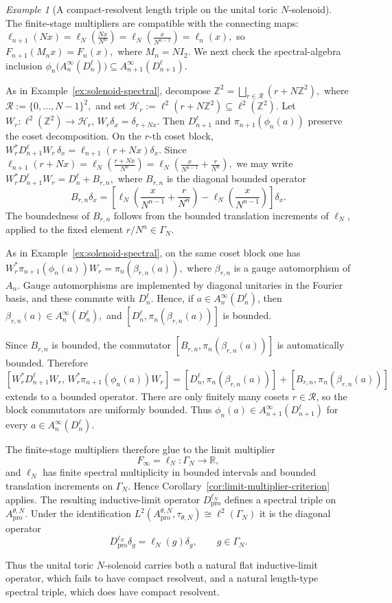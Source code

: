 \documentclass[11pt]{amsart}
\theoremstyle{definition}
\theoremstyle{remark}
\newtheorem{example}[theorem]{Example}
\newcommand{\Z}{\mathbb{Z}}
\newcommand{\R}{\mathbb{R}}
\newcommand{\ex}{\mathrm{pro}}
\begin{document}
\begin{example}[A compact-resolvent length triple on the unital toric \(N\)-solenoid]
The finite-stage multipliers are compatible with the connecting maps: $\ell_{n+1}(Nx)
=\ell_N\left(\frac{Nx}{N^n}\right)
=\ell_N\left(\frac{x}{N^{n-1}}\right)=\ell_n(x),$
so $F_{n+1}(M_nx)=F_n(x), $ where $M_n=NI_2.$ 
We next check the spectral-algebra inclusion $\phi_n\bigl(A_n^\infty(D_n^\ell)\bigr)
\subseteq A_{n+1}^\infty(D_{n+1}^\ell).$

As in Example~\ref{ex:solenoid-spectral}, decompose $\Z^2=\bigsqcup_{r\in\mathcal R}(r+N\Z^2),$ where
$\mathcal R:=\{0,\ldots,N-1\}^2,$ and set $\mathcal H_r:=\ell^2(r+N\Z^2)\subseteq \ell^2(\Z^2).$
Let $W_r\colon \ell^2(\Z^2)\to \mathcal H_r$, $W_r\delta_x=\delta_{r+Nx}.$
Then $D_{n+1}^\ell$ and \(\pi_{n+1}(\phi_n(a))\) preserve the coset decomposition. On the $r$-th coset block, $W_r^*D_{n+1}^\ell W_r\,\delta_x=\ell_{n+1}(r+Nx)\delta_x.$ Since $\ell_{n+1}(r+Nx)=\ell_N\left(\frac{r+Nx}{N^n}\right)
=\ell_N\left(\frac{x}{N^{n-1}}+\frac{r}{N^n}\right),$
we may write $W_r^*D_{n+1}^\ell W_r=D_n^\ell+B_{r,n},$
where \(B_{r,n}\) is the diagonal bounded operator
\[
B_{r,n}\delta_x
=
\left[
\ell_N\left(\frac{x}{N^{n-1}}+\frac{r}{N^n}\right)
-
\ell_N\left(\frac{x}{N^{n-1}}\right)
\right]\delta_x .
\]
The boundedness of $B_{r,n}$ follows from the bounded translation increments
of $\ell_N$, applied to the fixed element $r/N^n\in\Gamma_N$.

As in Example~\ref{ex:solenoid-spectral}, on the same coset block one has $W_r^*\pi_{n+1}(\phi_n(a))W_r
=\pi_n(\beta_{r,n}(a)),$ where $\beta_{r,n}$ is a gauge automorphism of $A_n$. Gauge automorphisms
are implemented by diagonal unitaries in the Fourier basis, and these commute
with $D_n^\ell$. Hence, if $a\in A_n^\infty(D_n^\ell)$, then $\beta_{r,n}(a)\in A_n^\infty(D_n^\ell),$
and $[D_n^\ell,\pi_n(\beta_{r,n}(a))]$
is bounded.

Since $B_{r,n}$ is bounded, the commutator $[B_{r,n},\pi_n(\beta_{r,n}(a))]$
is automatically bounded. Therefore
\[
[
W_r^*D_{n+1}^\ell W_r,\,
W_r^*\pi_{n+1}(\phi_n(a))W_r
]
=
[D_n^\ell,\pi_n(\beta_{r,n}(a))]
+
[B_{r,n},\pi_n(\beta_{r,n}(a))]
\]
extends to a bounded operator. There are only finitely many cosets
$r\in\mathcal R$, so the block commutators are uniformly bounded. Thus $\phi_n(a)\in A_{n+1}^\infty(D_{n+1}^\ell)$
for every $a\in A_n^\infty(D_n^\ell)$.


The finite-stage multipliers therefore glue to the limit multiplier
\[
F_\infty=\ell_N\colon \Gamma_N\to\R,
\]
and $\ell_N$ has finite spectral multiplicity in bounded intervals and
bounded translation increments on \(\Gamma_N\). Hence
Corollary~\ref{cor:limit-multiplier-criterion} applies. The resulting
inductive-limit operator $D_{\ex}^{ \ell_N}$
defines a spectral triple on $A_{\ex}^{\theta,N}$. Under the identification $L^2(A_{\ex}^{\theta,N},\tau_{\theta,N})\cong \ell^2(\Gamma_N)$
it is the diagonal operator
\[
D_{\ex}^{ \ell_N}\delta_g=\ell_N(g)\delta_g,
\qquad g\in\Gamma_N.
\]

Thus the unital toric $N$-solenoid carries both a natural flat inductive-limit
operator, which fails to have compact resolvent, and a natural length-type
spectral triple, which does have compact resolvent.
\end{example}
\end{document}
